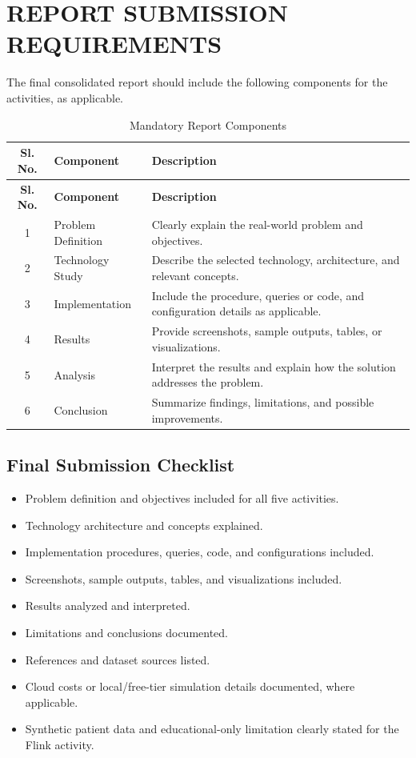 \documentclass[12pt,a4paper]{report}
\begin{document}
\chapter{REPORT SUBMISSION REQUIREMENTS}

The final consolidated report should include the following components
for the activities, as applicable.

\begin{longtable}{|c|p{3.3cm}|p{8.0cm}|}
\caption{Mandatory Report Components}\\
\hline
\textbf{Sl. No.} & \textbf{Component} & \textbf{Description}\\
\hline
\endfirsthead
\hline
\textbf{Sl. No.} & \textbf{Component} & \textbf{Description}\\
\hline
\endhead
1 & Problem Definition & Clearly explain the real-world problem and objectives.\\
\hline
2 & Technology Study & Describe the selected technology, architecture, and relevant concepts.\\
\hline
3 & Implementation & Include the procedure, queries or code, and configuration details as applicable.\\
\hline
4 & Results & Provide screenshots, sample outputs, tables, or visualizations.\\
\hline
5 & Analysis & Interpret the results and explain how the solution addresses the problem.\\
\hline
6 & Conclusion & Summarize findings, limitations, and possible improvements.\\
\hline
\end{longtable}

\section*{Final Submission Checklist}
\begin{itemize}
    \item[$\square$] Problem definition and objectives included for all five activities.
    \item[$\square$] Technology architecture and concepts explained.
    \item[$\square$] Implementation procedures, queries, code, and configurations included.
    \item[$\square$] Screenshots, sample outputs, tables, and visualizations included.
    \item[$\square$] Results analyzed and interpreted.
    \item[$\square$] Limitations and conclusions documented.
    \item[$\square$] References and dataset sources listed.
    \item[$\square$] Cloud costs or local/free-tier simulation details documented, where applicable.
    \item[$\square$] Synthetic patient data and educational-only limitation clearly stated for the Flink activity.
\end{itemize}
\end{document}
